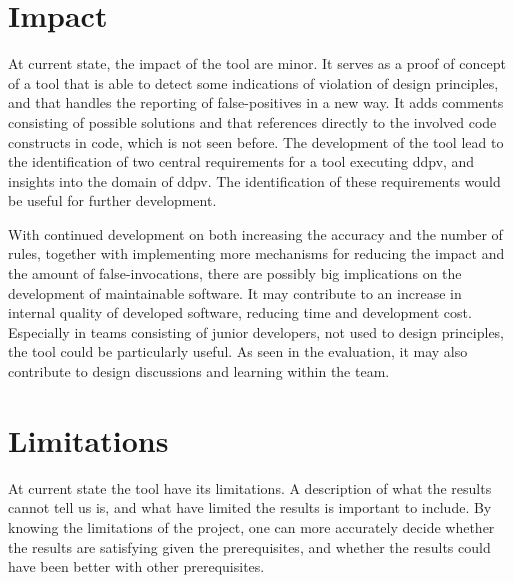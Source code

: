 \documentclass{report}
\begin{document}
\section{Impact}

At current state, the impact of the tool are minor. It serves as a proof of concept of a tool that is able to detect some indications of violation of design principles, and that handles the reporting of false-positives in a new way. It adds comments consisting of possible solutions and that references directly to the involved code constructs in code, which is not seen before. The development of the tool lead to the identification of two central requirements for a tool executing \gls{ddpv}, and insights into the domain of \gls{ddpv}. The identification of these requirements would be useful for further development.

With continued development on both increasing the accuracy and the number of rules, together with implementing more mechanisms for reducing the impact and the amount of false-invocations, there are possibly big implications on the development of maintainable software. It may contribute to an increase in internal quality of developed software, reducing time and development cost. Especially in teams consisting of junior developers, not used to design principles, the tool could be particularly useful. As seen in the evaluation, it may also contribute to design discussions and learning within the team.


\section{Limitations}
At current state the tool have its limitations. A description of what the results cannot tell us is, and what have limited the results is important to include. By knowing the limitations of the project, one can more accurately decide whether the results are satisfying given the prerequisites, and whether the results could have been better with other prerequisites. 

\end{document}
